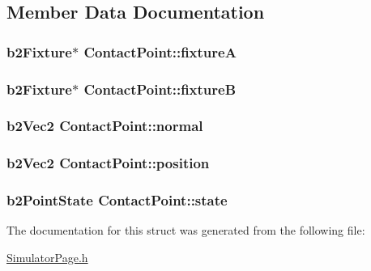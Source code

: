\subsection{Member Data Documentation}
\hypertarget{structContactPoint_ae0abe83cac1d16a0251c00eec2fdd9a8}{
\subsubsection[{fixture\-A}]{\setlength{\rightskip}{0pt plus 5cm}b2\-Fixture$\ast$ Contact\-Point\-::fixture\-A}}\label{structContactPoint_ae0abe83cac1d16a0251c00eec2fdd9a8}
\hypertarget{structContactPoint_a79157784afc39cf079438567b32e1612}{
\subsubsection[{fixture\-B}]{\setlength{\rightskip}{0pt plus 5cm}b2\-Fixture$\ast$ Contact\-Point\-::fixture\-B}}\label{structContactPoint_a79157784afc39cf079438567b32e1612}
\hypertarget{structContactPoint_a41bc30994cbefb7c33ed08fc5196a56e}{
\subsubsection[{normal}]{\setlength{\rightskip}{0pt plus 5cm}b2\-Vec2 Contact\-Point\-::normal}}\label{structContactPoint_a41bc30994cbefb7c33ed08fc5196a56e}
\hypertarget{structContactPoint_a4fb05c387ebf7e3d0a44c7655b5dd6b5}{
\subsubsection[{position}]{\setlength{\rightskip}{0pt plus 5cm}b2\-Vec2 Contact\-Point\-::position}}\label{structContactPoint_a4fb05c387ebf7e3d0a44c7655b5dd6b5}
\hypertarget{structContactPoint_a1b95214f8bd0f1e8ceb4a990dd1b8cc4}{
\subsubsection[{state}]{\setlength{\rightskip}{0pt plus 5cm}b2\-Point\-State Contact\-Point\-::state}}\label{structContactPoint_a1b95214f8bd0f1e8ceb4a990dd1b8cc4}


The documentation for this struct was generated from the following file\-:\begin{DoxyCompactItemize}
\item 
\hyperlink{SimulatorPage_8h}{Simulator\-Page.\-h}\end{DoxyCompactItemize}
